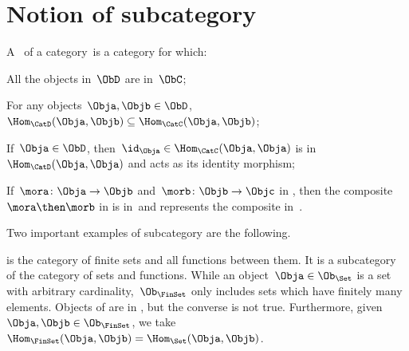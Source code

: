 \label{sec:specialization}


\section{Notion of subcategory}
\begin{ctdefinition}[Subcategory]
  \label{def:subcategory}
  A \emph{}~\CatD of a category~\CatC is a category for which:
  \begin{compactenum}
    \item All the objects in~$\ObD$ are in~$\ObC$;
    \item For any objects~$\Obja,\Objb\in \ObD$,~$\Hom_\CatD(\Obja,\Objb)\subseteq \Hom_\CatC(\Obja,\Objb)$;
    \item If~$\Obja\in \ObD$, then~$\id_\Obja \in \Hom_\CatC(\Obja,\Obja)$ is in~$\Hom_\CatD(\Obja,\Obja)$ and acts as its identity morphism;
    \item If~$\mora \colon \Obja \to \Objb$ and~$\morb\colon \Objb\to \Objc$ in \CatD, then the composite~$\mora \then \morb$ in \CatC is in~\CatD and represents the composite in~\CatD.
  \end{compactenum}
\end{ctdefinition}

Two important examples of subcategory are the following.

\begin{example}
  \label{ex:FinSet}
  \iindex{\FinSet} is the category of finite sets and all functions between them. It is a subcategory of the category \Set of sets and functions. While an object~$\Obja \in \Ob_\Set$ is a set with arbitrary cardinality,~$\Ob_{\FinSet}$ only includes sets which have finitely many elements. Objects of \FinSet are in \Set, but the converse is not true. Furthermore, given~$\Obja,\Objb\in \Ob_\FinSet$, we take~$\Hom_{\FinSet}(\Obja,\Objb)=\Hom_{\Set}(\Obja,\Objb)$.
\end{example}


